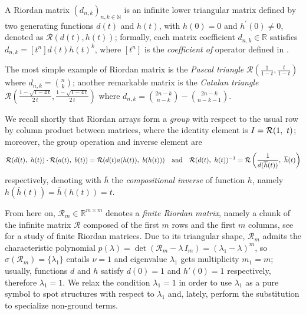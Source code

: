 
A Riordan matrix $(d_{n,k})_{n,k\in\mathbb{N}}$ is an infinite lower triangular
matrix defined by two generating functions $d(t)$ and $h(t)$, with $h(0)=0$ and
$h^{\prime}(0)\neq 0$,  %
denoted as $\mathcal{R}(d(t), h(t))$; formally, each matrix coefficient
$d_{n,k}\in\mathbb{R}$ satisfies $d_{n, k}=[t^{n}]d(t)h(t)^{k}$, where
$[t^{n}]$ is the \textit{coefficient of} operator defined in \cite{MSV07}.
\iffalse %
formal power series enumerating coefficients that lie on column $k$; to
summarize, 
\fi

The most simple example of Riordan matrix is the \textit{Pascal triangle}
$\mathcal{R}\left(\frac{1}{1-t}, \frac{t}{1-t}\right)$ where
$d_{n,k}={n\choose k}$; another remarkable matrix is the \textit{Catalan
triangle} $\mathcal{R}\left(\frac{1-\sqrt{1-4\,t}}{2\,t},
\frac{1-\sqrt{1-4\,t}}{2\,t}\right)$ where $d_{n,k}={{2n-k}\choose{n-k}} -
{{2n-k}\choose{n-k-1}}$. 

We recall shortly that Riordan arrays form a \textit{group} with respect to the
usual row by column product between matrices, where the identity element is $I
= \mbox{$\mathcal{R}$}(1,\ t)$; moreover, the group operation and inverse element are
\begin{equation}
\label{eq:Riordan-group-ops}
\mbox{$\mathcal{R}$}(d(t),\ h(t)) \cdot \mbox{$\mathcal{R}$}(a(t),\ b(t)) = \mbox{$\mathcal{R}$}(d(t) a(h(t)),\
b(h(t)))\quad\text{and}\quad\mbox{$\mathcal{R}$}(d(t),\ h(t))^{-1} = \mbox{$\mathcal{R}$}\left( \frac{1}
{d(\overline{h}(t))},\ \overline{h}(t) \right)
\end{equation}
respectively, denoting with $\overline{h}$ the \textit{compositional
inverse} of function $h$, namely $h(\overline{h}(t)) = \overline{h}(h(t)) = t$.

From here on, $\mathcal{R}_{m}\in\mathbb{R}^{m\times m}$ denotes a \emph{finite
Riordan matrix}, namely a chunk of the infinite matrix $\mathcal{R}$ composed
of the first $m$ rows and the first $m$ columns, see \cite{LUZON2016239} for a
study of finite Riordan matrices. Due to its triangular shape, $\mathcal{R}_{m}$ admits the
characteristic polynomial $p(\lambda) = \det{\left(\mathcal{R}_{m}-\lambda\,I_{m}
\right)} = \left(\lambda_{1}-\lambda \right)^{m}$, so
$\sigma(\mathcal{R}_{m})= \lbrace \lambda_{1} \rbrace$ entails $\nu=1$ and
eigenvalue $\lambda_{1}$ gets multiplicity $m_{1}=m$; usually, functions $d$
and $h$ satisfy $d(0)=1$ and $h'(0)=1$ respectively, therefore $\lambda_{1}=1$.
We relax the condition $\lambda_{1}=1$ in order to use $\lambda_{1}$ as a pure
symbol to spot structures with respect to $\lambda_{1}$ and, lately, perform
the substitution to specialize non-ground terms.


